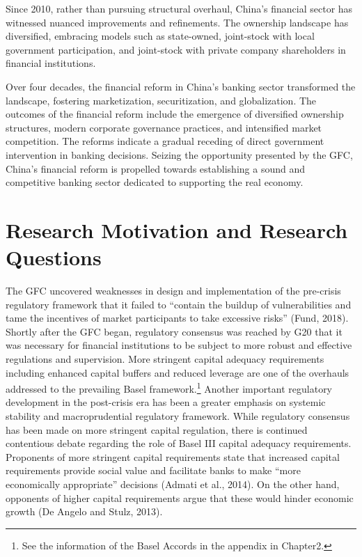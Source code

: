 \documentclass[
  12pt,
  a4paper,
]{scrreprt}
\begin{document}
{{{{Since 2010, rather than pursuing structural overhaul, China's financial
sector has witnessed nuanced improvements and refinements. The ownership
landscape has diversified, embracing models such as state-owned,
joint-stock with local government participation, and joint-stock with
private company shareholders in financial institutions.

Over four decades, the financial reform in China's banking sector
transformed the landscape, fostering marketization, securitization, and
globalization. The outcomes of the financial reform include the
emergence of diversified ownership structures, modern corporate
governance practices, and intensified market competition. The reforms
indicate a gradual receding of direct government intervention in banking
decisions. Seizing the opportunity presented by the GFC, China's
financial reform is propelled towards establishing a sound and
competitive banking sector dedicated to supporting the real economy.

\section{Research Motivation and Research
Questions}\label{research-motivation-and-research-questions}

The GFC uncovered weaknesses in design and implementation of the
pre-crisis regulatory framework that it failed to ``contain the buildup
of vulnerabilities and tame the incentives of market participants to
take excessive risks'' (Fund, 2018). Shortly after the GFC began,
regulatory consensus was reached by G20 that it was necessary for
financial institutions to be subject to more robust and effective
regulations and supervision. More stringent capital adequacy
requirements including enhanced capital buffers and reduced leverage are
one of the overhauls addressed to the prevailing Basel
framework.\footnote{See the information of the Basel Accords in the
  appendix in Chapter2.} Another important regulatory development in the
post-crisis era has been a greater emphasis on systemic stability and
macroprudential regulatory framework. While regulatory consensus has
been made on more stringent capital regulation, there is continued
contentious debate regarding the role of Basel III capital adequacy
requirements. Proponents of more stringent capital requirements state
that increased capital requirements provide social value and facilitate
banks to make ``more economically appropriate'' decisions (Admati et
al., 2014). On the other hand, opponents of higher capital requirements
argue that these would hinder economic growth (De Angelo and Stulz,
2013).

}}}}
\end{document}
